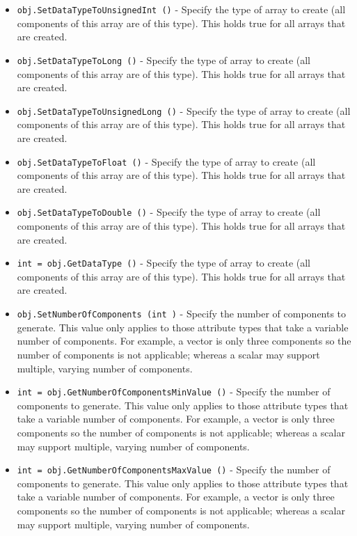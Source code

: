 \begin{itemize}
\item  \verb|obj.SetDataTypeToUnsignedInt ()| -  Specify the type of array to create (all components of this array are of this
 type). This holds true for all arrays that are created.

\item  \verb|obj.SetDataTypeToLong ()| -  Specify the type of array to create (all components of this array are of this
 type). This holds true for all arrays that are created.

\item  \verb|obj.SetDataTypeToUnsignedLong ()| -  Specify the type of array to create (all components of this array are of this
 type). This holds true for all arrays that are created.

\item  \verb|obj.SetDataTypeToFloat ()| -  Specify the type of array to create (all components of this array are of this
 type). This holds true for all arrays that are created.

\item  \verb|obj.SetDataTypeToDouble ()| -  Specify the type of array to create (all components of this array are of this
 type). This holds true for all arrays that are created.

\item  \verb|int = obj.GetDataType ()| -  Specify the type of array to create (all components of this array are of this
 type). This holds true for all arrays that are created.

\item  \verb|obj.SetNumberOfComponents (int )| -  Specify the number of components to generate. This value only applies to those
 attribute types that take a variable number of components. For example, a vector
 is only three components so the number of components is not applicable; whereas
 a scalar may support multiple, varying number of components.

\item  \verb|int = obj.GetNumberOfComponentsMinValue ()| -  Specify the number of components to generate. This value only applies to those
 attribute types that take a variable number of components. For example, a vector
 is only three components so the number of components is not applicable; whereas
 a scalar may support multiple, varying number of components.

\item  \verb|int = obj.GetNumberOfComponentsMaxValue ()| -  Specify the number of components to generate. This value only applies to those
 attribute types that take a variable number of components. For example, a vector
 is only three components so the number of components is not applicable; whereas
 a scalar may support multiple, varying number of components.


\end{itemize}
